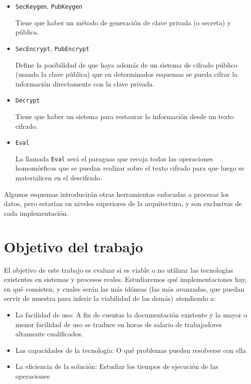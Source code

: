 \begin{itemize}
    \item \verb|SecKeygen|, \verb|PubKeygen|

    Tiene que haber un método de generación de clave privada (o secreta) y pública.

    \item \verb|SecEncrypt|, \verb|PubEncrypt|

    Define la posibilidad de que haya además de un sistema de cifrado público (usando la clave pública) que en determinados esquemas se pueda cifrar la información directamente con la clave privada.

    \item \verb|Decrypt|

    Tiene que haber un sistema para restaurar la información desde un texto cifrado.

    \item \verb|Eval|

    La llamada \verb|Eval| será el paraguas que recoja todas las operaciones homomórficas que se puedan realizar sobre el texto cifrado para que luego se materialicen en el descifrado.

\end{itemize}

Algunos esquemas introducirán otras herramientas enfocadas a procesar los datos, pero estarían en niveles superiores de la arquitectura, y son exclusivas de cada implementación.

\section{Objetivo del trabajo}

El objetivo de este trabajo es evaluar si es viable o no utilizar las tecnologías existentes en sistemas y procesos reales. Estudiaremos qué implementaciones hay, en qué consisten, y cuales serán las más idóneas (las más avanzadas, que puedan servir de muestra para inferir la viabilidad de las demás) atendiendo a:

\begin{itemize}
    \item La facilidad de uso: A fin de cuentas la documentación existente y la mayor o menor facilidad de uso se traduce en horas de salario de trabajadores altamente cualificados.
    \item Las capacidades de la tecnología: O qué problemas pueden resolverse con ella
    \item La eficiencia de la solución: Estudiar los tiempos de ejecución de las operaciones
\end{itemize}
